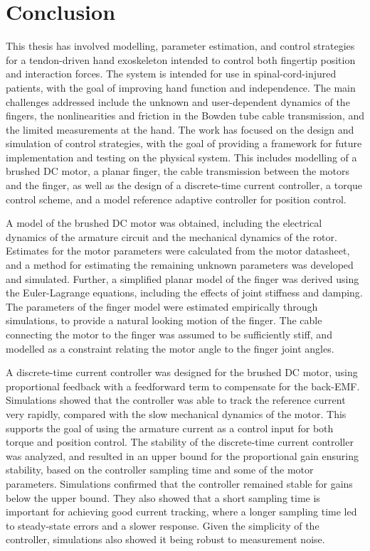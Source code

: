 \chapter{Conclusion}%
\label{ch:conclusion}

This thesis has involved modelling, parameter estimation, and control strategies for a tendon-driven hand exoskeleton intended to control both fingertip position and interaction forces. The system is intended for use in spinal-cord-injured patients, with the goal of improving hand function and independence. The main challenges addressed include the unknown and user-dependent dynamics of the fingers, the nonlinearities and friction in the Bowden tube cable transmission, and the limited measurements at the hand. The work has focused on the design and simulation of control strategies, with the goal of providing a framework for future implementation and testing on the physical system. This includes modelling of a brushed DC motor, a planar finger, the cable transmission between the motors and the finger, as well as the design of a discrete-time current controller, a torque control scheme, and a model reference adaptive controller for position control.

A model of the brushed DC motor was obtained, including the electrical dynamics of the armature circuit and the mechanical dynamics of the rotor. Estimates for the motor parameters were calculated from the motor datasheet, and a method for estimating the remaining unknown parameters was developed and simulated. Further, a simplified planar model of the finger was derived using the Euler-Lagrange equations, including the effects of joint stiffness and damping. The parameters of the finger model were estimated empirically through simulations, to provide a natural looking motion of the finger. The cable connecting the motor to the finger was assumed to be sufficiently stiff, and modelled as a constraint relating the motor angle to the finger joint angles. 

A discrete-time current controller was designed for the brushed DC motor, using proportional feedback with a feedforward term to compensate for the \mbox{back-EMF}. Simulations showed that the controller was able to track the reference current very rapidly, compared with the slow mechanical dynamics of the motor. This supports the goal of using the armature current as a control input for both torque and position control. The stability of the discrete-time current controller was analyzed, and resulted in an upper bound for the proportional gain ensuring stability, based on the controller sampling time and some of the motor parameters. Simulations confirmed that the controller remained stable for gains below the upper bound. They also showed that a short sampling time is important for achieving good current tracking, where a longer sampling time led to steady-state errors and a slower response. Given the simplicity of the controller, simulations also showed it being robust to measurement noise.

